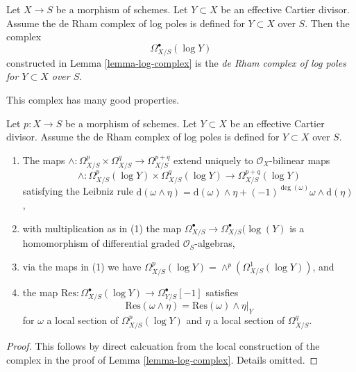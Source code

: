 \begin{definition}
\label{definition-log-complex}
Let $X \to S$ be a morphism of schemes. Let $Y \subset X$ be an
effective Cartier divisor. Assume the de Rham complex of log poles
is defined for $Y \subset X$ over $S$. Then the complex
$$
\Omega^\bullet_{X/S}(\log Y)
$$
constructed in Lemma \ref{lemma-log-complex} is the
{\it de Rham complex of log poles for $Y \subset X$ over $S$}.
\end{definition}

\noindent
This complex has many good properties.

\begin{lemma}
\label{lemma-multiplication-log}
Let $p : X \to S$ be a morphism of schemes. Let $Y \subset X$ be an
effective Cartier divisor. Assume the de Rham complex of log poles
is defined for $Y \subset X$ over $S$.
\begin{enumerate}
\item The maps
$\wedge : \Omega^p_{X/S} \times \Omega^q_{X/S} \to \Omega^{p + q}_{X/S}$
extend uniquely to $\mathcal{O}_X$-bilinear maps
$$
\wedge : \Omega^p_{X/S}(\log Y) \times \Omega^q_{X/S}(\log Y)
\to \Omega^{p + q}_{X/S}(\log Y)
$$
satisfying the Leibniz rule
$
\text{d}(\omega \wedge \eta) = \text{d}(\omega) \wedge \eta +
(-1)^{\deg(\omega)} \omega \wedge \text{d}(\eta)$,
\item with multiplication as in (1) the map
$\Omega^\bullet_{X/S} \to \Omega^\bullet_{X/S}(\log(Y)$
is a homomorphism of differential graded $\mathcal{O}_S$-algebras,
\item via the maps in (1) we have $\Omega^p_{X/S}(\log Y) =
\wedge^p(\Omega^1_{X/S}(\log Y))$, and
\item the map
$\text{Res} : \Omega^\bullet_{X/S}(\log Y) \to \Omega^\bullet_{Y/S}[-1]$
satisfies
$$
\text{Res}(\omega \wedge \eta) = \text{Res}(\omega) \wedge \eta|_Y
$$
for $\omega$ a local section of $\Omega^p_{X/S}(\log Y)$ and $\eta$
a local section of $\Omega^q_{X/S}$.
\end{enumerate}
\end{lemma}

\begin{proof}
This follows by direct calcuation from the local construction
of the complex in the proof of Lemma \ref{lemma-log-complex}.
Details omitted.
\end{proof}

